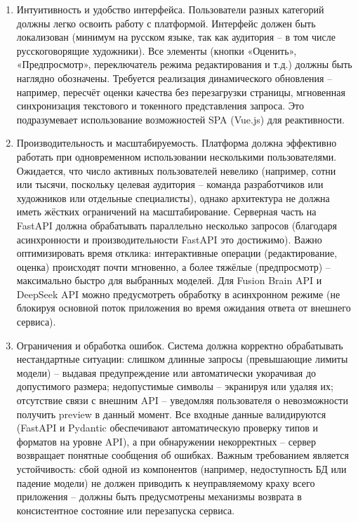\begin{enumerate}[label=\arabic*]
    \item Интуитивность и удобство интерфейса. Пользователи разных категорий должны легко освоить работу с платформой. Интерфейс должен быть локализован (минимум на русском языке, так как аудитория – в том числе русскоговорящие художники). Все элементы (кнопки «Оценить», «Предпросмотр», переключатель режима редактирования и т.д.) должны быть наглядно обозначены. Требуется реализация динамического обновления – например, пересчёт оценки качества без перезагрузки страницы, мгновенная синхронизация текстового и токенного представления запроса. Это подразумевает использование возможностей SPA (Vue.js) для реактивности.
    \item  Производительность и масштабируемость. Платформа должна эффективно работать при одновременном использовании несколькими пользователями. Ожидается, что число активных пользователей невелико (например, сотни или тысячи, поскольку целевая аудитория – команда разработчиков или художников или отдельные специалисты), однако архитектура не должна иметь жёстких ограничений на масштабирование. Серверная часть на FastAPI должна обрабатывать параллельно несколько запросов (благодаря асинхронности и производительности FastAPI это достижимо)\cite{fastapi:practicum}. Важно оптимизировать время отклика: интерактивные операции (редактирование, оценка) происходят почти мгновенно, а более тяжёлые (предпросмотр) – максимально быстро для выбранных моделей.  Для Fusion Brain API и DeepSeek API можно предусмотреть обработку в асинхронном режиме (не блокируя основной поток приложения во время ожидания ответа от внешнего сервиса).
    \item Ограничения и обработка ошибок. Система должна корректно обрабатывать нестандартные ситуации: слишком длинные запросы (превышающие лимиты модели) – выдавая предупреждение или автоматически укорачивая до допустимого размера; недопустимые символы – экранируя или удаляя их; отсутствие связи с внешним API – уведомляя пользователя о невозможности получить preview в данный момент. Все входные данные валидируются (FastAPI и Pydantic обеспечивают автоматическую проверку типов и форматов на уровне API\cite{yandex:fastapi}), а при обнаружении некорректных – сервер возвращает понятные сообщения об ошибках. Важным требованием является устойчивость: сбой одной из компонентов (например, недоступность БД или падение модели) не должен приводить к неуправляемому краху всего приложения – должны быть предусмотрены механизмы возврата в консистентное состояние или перезапуска сервиса.

\end{enumerate}
